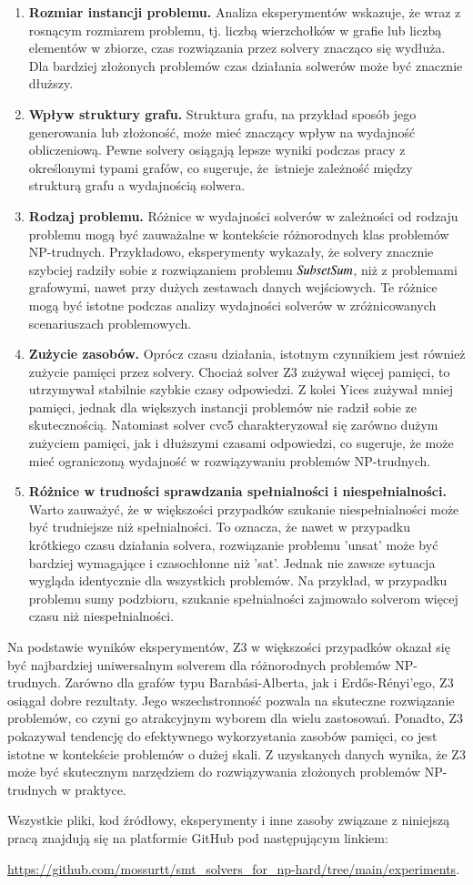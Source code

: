 \begin{enumerate}
	\item \textbf{Rozmiar instancji problemu.} 
	Analiza eksperymentów wskazuje, że wraz z rosnącym rozmiarem problemu, tj. liczbą wierzchołków w grafie lub liczbą elementów w zbiorze, czas rozwiązania przez solvery znacząco się wydłuża. Dla bardziej złożonych problemów czas działania solwerów może być znacznie dłuższy.
	\item \textbf{Wpływ struktury grafu.}
	Struktura grafu, na przykład sposób jego generowania lub złożoność, może mieć znaczący wpływ na wydajność obliczeniową. Pewne solvery osiągają lepsze wyniki podczas pracy z określonymi typami grafów, co sugeruje, że~istnieje zależność między strukturą grafu a wydajnością solwera.
	\item \textbf{Rodzaj problemu.} 
	Różnice w wydajności solverów w zależności od rodzaju problemu mogą być zauważalne w kontekście różnorodnych klas problemów NP-trudnych. Przykładowo, eksperymenty wykazały, że solvery znacznie szybciej radziły sobie z rozwiązaniem problemu ${\mathit{SubsetSum}}$, niż z problemami grafowymi, nawet przy dużych zestawach danych wejściowych. Te różnice mogą być istotne podczas analizy wydajności solverów w zróżnicowanych scenariuszach problemowych.
	\item \textbf{Zużycie zasobów.} 
	Oprócz czasu działania, istotnym czynnikiem jest również zużycie pamięci przez solvery. Chociaż solver Z3 zużywał więcej pamięci, to utrzymywał stabilnie szybkie czasy odpowiedzi. Z kolei Yices zużywał mniej pamięci, jednak dla większych instancji problemów nie radził sobie ze skutecznością. Natomiast solver cvc5 charakteryzował się zarówno dużym zużyciem pamięci, jak i dłuższymi czasami odpowiedzi, co sugeruje, że może mieć ograniczoną wydajność w rozwiązywaniu problemów NP-trudnych.
	\item \textbf{Różnice w trudności sprawdzania spełnialności i niespełnialności.} 
	Warto zauważyć, że w większości przypadków szukanie niespełnialności może być trudniejsze niż spełnialności. To oznacza, że nawet w przypadku krótkiego czasu działania solvera, rozwiązanie problemu 'unsat' może być bardziej wymagające i czasochłonne niż 'sat'. Jednak nie zawsze sytuacja wygląda identycznie dla wszystkich problemów. Na przykład, w przypadku problemu sumy podzbioru, szukanie spełnialności zajmowało solverom więcej czasu niż niespełnialności. 
\end{enumerate}	

Na podstawie wyników eksperymentów, Z3 w większości przypadków okazał się być najbardziej uniwersalnym solverem dla różnorodnych problemów NP-trudnych. Zarówno dla grafów typu Barabási-Alberta, jak i Erdős-Rényi'ego, Z3 osiągał dobre rezultaty. Jego wszechstronność pozwala na skuteczne rozwiązanie problemów, co czyni go atrakcyjnym wyborem dla wielu zastosowań. Ponadto, Z3 pokazywał tendencję do efektywnego wykorzystania zasobów pamięci, co jest istotne w kontekście problemów o dużej skali. Z uzyskanych danych wynika, że Z3 może być skutecznym narzędziem do rozwiązywania złożonych problemów NP-trudnych w praktyce.

Wszystkie pliki, kod źródłowy, eksperymenty i inne zasoby związane z niniejszą pracą znajdują się na platformie GitHub pod następującym linkiem:

\url{https://github.com/mossurtt/smt_solvers_for_np-hard/tree/main/experiments}.